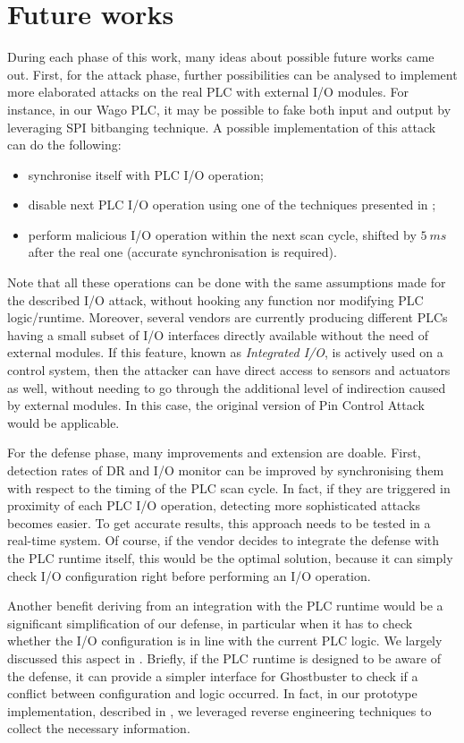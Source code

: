 \section{Future works}
\label{sec:future}

During each phase of this work, many ideas about possible future works came out.
First, for the attack phase, further possibilities can be analysed to implement more elaborated attacks on the real PLC with external I/O modules.
For instance, in our Wago PLC, it may be possible to fake both input and output by leveraging SPI bitbanging technique.
A possible implementation of this attack can do the following:
\begin{itemize}
	\item synchronise itself with PLC I/O operation;
	\item disable next PLC I/O operation using one of the techniques presented in ;
	\item perform malicious I/O operation within the next scan cycle, \eg shifted by $\SI{5}{ms}$ after the real one (accurate synchronisation is required).
\end{itemize}
Note that all these operations can be done with the same assumptions made for the described I/O attack, without hooking any function nor modifying PLC logic/runtime.
Moreover, several vendors are currently producing different PLCs having a small subset of I/O interfaces directly available without the need of external modules.
If this feature, known as \emph{Integrated I/O}, is actively used on a control system, then the attacker can have direct access to sensors and actuators as well,
without needing to go through the additional level of indirection caused by external modules. In this case, the original version of Pin Control Attack would be applicable.

For the defense phase, many improvements and extension are doable.
First, detection rates of DR and I/O monitor can be improved by synchronising them with respect to the timing of the PLC scan cycle.
In fact, if they are triggered in proximity of each PLC I/O operation, detecting more sophisticated attacks becomes easier.
To get accurate results, this approach needs to be tested in a real-time system.
Of course, if the vendor decides to integrate the defense with the PLC runtime itself, this would be the optimal solution, because it can simply check I/O configuration
right before performing an I/O operation.

Another benefit deriving from an integration with the PLC runtime would be a significant simplification of our defense,
in particular when it has to check whether the I/O configuration is in line with the current PLC logic.
We largely discussed this aspect in . Briefly, if the PLC runtime is designed to be aware of the defense,
it can provide a simpler interface for Ghostbuster to check if a conflict between configuration and logic occurred.
In fact, in our prototype implementation, described in , we leveraged reverse engineering techniques to collect the necessary information.

